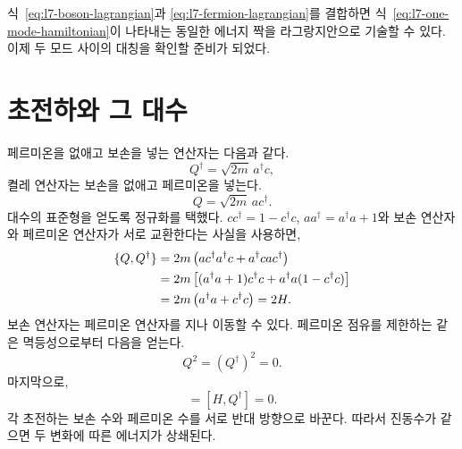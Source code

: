 식~\eqref{eq:l7-boson-lagrangian}과 \eqref{eq:l7-fermion-lagrangian}를 결합하면 식~\eqref{eq:l7-one-mode-hamiltonian}이 나타내는 동일한 에너지 짝을 라그랑지안으로 기술할 수 있다. 이제 두 모드 사이의 대칭을 확인할 준비가 되었다.

\section{초전하와 그 대수}

페르미온을 없애고 보손을 넣는 연산자는 다음과 같다.
\begin{equation}
Q^\dagger=\sqrt{2m}\,a^\dagger c,
\end{equation}
켤레 연산자는 보손을 없애고 페르미온을 넣는다.
\begin{equation}
Q=\sqrt{2m}\,a c^\dagger.
\end{equation}
대수의 표준형을 얻도록 정규화를 택했다. \(cc^\dagger=1-c^\dagger c\), \(aa^\dagger=a^\dagger a+1\)와 보손 연산자와 페르미온 연산자가 서로 교환한다는 사실을 사용하면,
\begin{align}
\{Q,Q^\dagger\}
&=2m\left(ac^\dagger a^\dagger c+a^\dagger c a c^\dagger\right)\notag\\
&=2m\left[(a^\dagger a+1)c^\dagger c
+a^\dagger a(1-c^\dagger c)\right]\notag\\
&=2m\left(a^\dagger a+c^\dagger c\right)=2H.
\label{eq:l7-superalgebra}
\end{align}
보손 연산자는 페르미온 연산자를 지나 이동할 수 있다. 페르미온 점유를 제한하는 같은 멱등성으로부터 다음을 얻는다.
\begin{equation}
Q^2=(Q^\dagger)^2=0.
\end{equation}
마지막으로,
\begin{equation}
[H,Q]=[H,Q^\dagger]=0.
\label{eq:l7-conserved-supercharges}
\end{equation}
각 초전하는 보손 수와 페르미온 수를 서로 반대 방향으로 바꾼다. 따라서 진동수가 같으면 두 변화에 따른 에너지가 상쇄된다.

\begin{classroomqa}
\end{classroomqa}

\begin{classroomqa}
\end{classroomqa}

